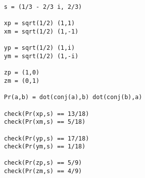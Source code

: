 
{\footnotesize\begin{verbatim}
s = (1/3 - 2/3 i, 2/3)

xp = sqrt(1/2) (1,1)
xm = sqrt(1/2) (1,-1)

yp = sqrt(1/2) (1,i)
ym = sqrt(1/2) (1,-i)

zp = (1,0)
zm = (0,1)

Pr(a,b) = dot(conj(a),b) dot(conj(b),a)

check(Pr(xp,s) == 13/18)
check(Pr(xm,s) == 5/18)

check(Pr(yp,s) == 17/18)
check(Pr(ym,s) == 1/18)

check(Pr(zp,s) == 5/9)
check(Pr(zm,s) == 4/9)
\end{verbatim}}

